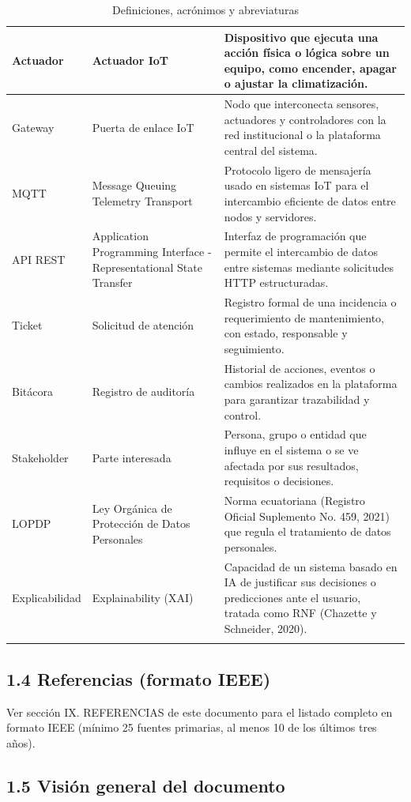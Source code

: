 \begin{longtable}{|P{0.3333}|P{0.3333}|P{0.3333}|}
Actuador & Actuador IoT & Dispositivo que ejecuta una acción física o lógica sobre un equipo, como encender, apagar o ajustar la climatización. \\ \hline
Gateway & Puerta de enlace IoT & Nodo que interconecta sensores, actuadores y controladores con la red institucional o la plataforma central del sistema. \\ \hline
MQTT & Message Queuing Telemetry Transport & Protocolo ligero de mensajería usado en sistemas IoT para el intercambio eficiente de datos entre nodos y servidores. \\ \hline
API REST & Application Programming Interface - Representational State Transfer & Interfaz de programación que permite el intercambio de datos entre sistemas mediante solicitudes HTTP estructuradas. \\ \hline
Ticket & Solicitud de atención & Registro formal de una incidencia o requerimiento de mantenimiento, con estado, responsable y seguimiento. \\ \hline
Bitácora & Registro de auditoría & Historial de acciones, eventos o cambios realizados en la plataforma para garantizar trazabilidad y control. \\ \hline
Stakeholder & Parte interesada & Persona, grupo o entidad que influye en el sistema o se ve afectada por sus resultados, requisitos o decisiones. \\ \hline
LOPDP & Ley Orgánica de Protección de Datos Personales & Norma ecuatoriana (Registro Oficial Suplemento No. 459, 2021) que regula el tratamiento de datos personales. \\ \hline
Explicabilidad & Explainability (XAI) & Capacidad de un sistema basado en IA de justificar sus decisiones o predicciones ante el usuario, tratada como RNF (Chazette y Schneider, 2020). \\ \hline
\caption{Definiciones, acrónimos y abreviaturas}
\end{longtable}
\endgroup

\subsection*{1.4 Referencias (formato IEEE)}


Ver sección IX. REFERENCIAS de este documento para el listado completo en formato IEEE (mínimo 25 fuentes primarias, al menos 10 de los últimos tres años).


\subsection*{1.5 Visión general del documento}

